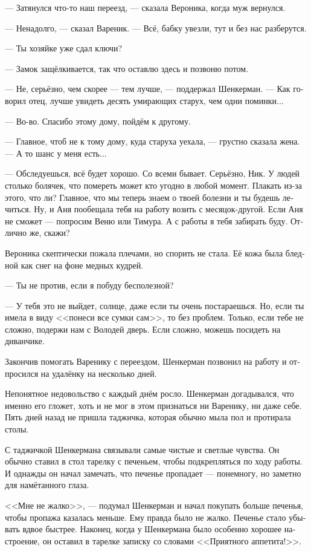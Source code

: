 \documentclass[a5paper,12pt,fleqn]{extbook}\usepackage{cooltooltips}\usepackage{polyglossia}\setdefaultlanguage[babelshorthands=true]{russian}\setotherlanguage{english}\defaultfontfeatures{Ligatures=TeX,Mapping=tex-text} \usepackage{xcolor}\definecolor{lightgray}{HTML}{bbbbbb}\color{lightgray}\newcommand{\ml}[3]{\textenglish{\textcolor{black}{#3}}}
\newcommand{\asterism}{\vspace{1em}{\centering\Large\bfseries$\ast~\ast~\ast$\par}\vspace{1em}}
\begin{document}
--- Затянулся что-то наш переезд, --- сказала Вероника, когда муж вернулся.

--- Ненадолго, --- сказал Вареник.
--- Всё, бабку увезли, тут и без нас разберутся.

--- Ты хозяйке уже сдал ключи?

--- Замок защёлкивается, так что оставлю здесь и позвоню потом.

--- Не, серьёзно, чем скорее --- тем лучше, --- поддержал Шенкерман.
--- Как говорил отец, лучше увидеть десять умирающих старух, чем одни поминки...

--- Во-во.
Спасибо этому дому, пойдём к другому.

--- Главное, чтоб не к тому дому, куда старуха уехала, --- грустно сказала жена.
--- А то шанс у меня есть...

--- Обследуешься, всё будет хорошо.
Со всеми бывает.
Серьёзно, Ник.
У людей столько болячек, что помереть может кто угодно в любой момент.
Плакать из-за этого, что ли?
Главное, что мы теперь знаем о твоей болезни и ты будешь лечиться.
Ну, и Аня пообещала тебя на работу возить с месяцок-другой.
Если Аня не сможет --- попросим Веню или Тимура.
А с работы я тебя забирать буду.
Отлично же, скажи?

Вероника скептически пожала плечами, но спорить не стала.
Её кожа была бледной как снег на фоне медных кудрей.

--- Ты не против, если я побуду бесполезной?

--- У тебя это не выйдет, солнце, даже если ты очень постараешься.
Но, если ты имела в виду <<понеси все сумки сам>>, то без проблем.
Только, если тебе не сложно, подержи нам с Володей дверь.
Если сложно, можешь посидеть на диванчике.

\asterism

Закончив помогать Варенику с переездом, Шенкерман позвонил на работу и отпросился на удалёнку на несколько дней.

Непонятное недовольство с каждый днём росло.
Шенкерман догадывался, что именно его гложет, хоть и не мог в этом признаться ни Варенику, ни даже себе.
Пять дней назад не пришла таджичка, которая обычно мыла пол и протирала столы.

С таджичкой Шенкермана связывали самые чистые и светлые чувства.
Он обычно ставил в стол тарелку с печеньем, чтобы подкрепляться по ходу работы.
И однажды он начал замечать, что печенье пропадает --- понемногу, но заметно для намётанного глаза.

<<Мне не жалко>>, --- подумал Шенкерман и начал покупать больше печенья, чтобы пропажа казалась меньше.
Ему правда было не жалко.
Печенье стало убывать вдвое быстрее.
Наконец, когда у Шенкермана было особенно хорошее настроение, он оставил в тарелке записку со словами <<Приятного аппетита!>>.
\end{document}
